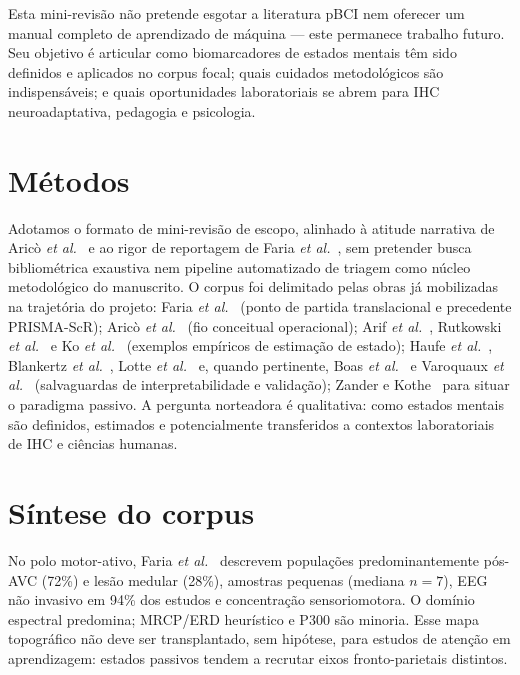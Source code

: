 \documentclass[12pt]{article}
\begin{document}
Esta mini-revis\~{a}o n\~{a}o pretende esgotar a literatura pBCI nem oferecer um manual completo de aprendizado de m\'{a}quina --- este permanece trabalho futuro. Seu objetivo \'{e} articular como biomarcadores de estados mentais t\^{e}m sido definidos e aplicados no corpus focal; quais cuidados metodol\'{o}gicos s\~{a}o indispens\'{a}veis; e quais oportunidades laboratoriais se abrem para IHC neuroadaptativa, pedagogia e psicologia.

\section{M\'{e}todos}

Adotamos o formato de mini-revis\~{a}o de escopo, alinhado \`{a} atitude narrativa de Aric\`{o} \textit{et al.}~\cite{Arico2017} e ao rigor de reportagem de Faria \textit{et al.}~\cite{Faria2026}, sem pretender busca bibliom\'{e}trica exaustiva nem pipeline automatizado de triagem como n\'{u}cleo metodol\'{o}gico do manuscrito. O corpus foi delimitado pelas obras j\'{a} mobilizadas na trajet\'{o}ria do projeto: Faria \textit{et al.}~\cite{Faria2026} (ponto de partida translacional e precedente PRISMA-ScR); Aric\`{o} \textit{et al.}~\cite{Arico2017,Arico2016ATM} (fio conceitual operacional); Arif \textit{et al.}~\cite{Arif2023}, Rutkowski \textit{et al.}~\cite{Rutkowski2023} e Ko \textit{et al.}~\cite{Ko2021} (exemplos emp\'{i}ricos de estima\c{c}\~{a}o de estado); Haufe \textit{et al.}~\cite{Haufe2014}, Blankertz \textit{et al.}~\cite{Blankertz2011}, Lotte \textit{et al.}~\cite{Lotte2018} e, quando pertinente, Boas \textit{et al.}~\cite{Boas2020} e Varoquaux \textit{et al.}~\cite{Varoquaux2017} (salvaguardas de interpretabilidade e valida\c{c}\~{a}o); Zander e Kothe~\cite{Zander2016} para situar o paradigma passivo. A pergunta norteadora \'{e} qualitativa: como estados mentais s\~{a}o definidos, estimados e potencialmente transferidos a contextos laboratoriais de IHC e ci\^{e}ncias humanas.

\section{S\'{i}ntese do corpus}

No polo motor-ativo, Faria \textit{et al.}~\cite{Faria2026} descrevem popula\c{c}\~{o}es predominantemente p\'{o}s-AVC (72\%) e les\~{a}o medular (28\%), amostras pequenas (mediana $n=7$), EEG n\~{a}o invasivo em 94\% dos estudos e concentra\c{c}\~{a}o sensoriomotora. O dom\'{i}nio espectral predomina; MRCP/ERD heur\'{i}stico e P300 s\~{a}o minoria. Esse mapa topogr\'{a}fico n\~{a}o deve ser transplantado, sem hip\'{o}tese, para estudos de aten\c{c}\~{a}o em aprendizagem: estados passivos tendem a recrutar eixos fronto-parietais distintos.
\end{document}
